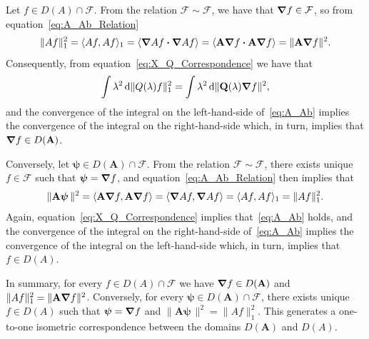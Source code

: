 \documentclass[leqno,onefignum,onetabnum]{siamltex1213}
\renewcommand{\d}{\mathrm{d}}
\newcommand{\Ab}{\mathbf{A}}
\newcommand{\Qb}{\mathbf{Q}}
\newcommand{\Fc}{\mathcal{F}}
\newcommand{\Fs}{\mathscr{F}}
\newcommand\bnabla{\mbox{\boldmath${\nabla}$}}
\providecommand\bcdot{\boldsymbol{\cdot}}
\newcommand{\vecpsi}{\boldsymbol{\psi}}
\begin{document}
Let $f\in D(A)\cap\Fs$. From the relation
$\Fs\sim\Fc$, we have that $\bnabla f\in\Fc$, so from
equation~\eqref{eq:A_Ab_Relation}    
%
\begin{align}\label{eq:Norm_A_Ab}
  \|Af\|_1^2=\langle Af,Af\rangle_1
        =\langle\bnabla  A f\bcdot\bnabla  A f\rangle
        =\langle\Ab\bnabla f\bcdot\Ab\bnabla f\rangle
        =\|\Ab\bnabla f\|^2.
\end{align}
%
Consequently, from equation~\eqref{eq:X_Q_Correspondence} we have that
%
\begin{align}\label{eq:A_Ab}
  \int\lambda^2\,\d\|Q(\lambda)f\|_1^2=\int\lambda^2\,\d\|\Qb(\lambda)\bnabla f\|^2,
\end{align}
%
and the convergence of the integral on the left-hand-side
of~\eqref{eq:A_Ab} implies the convergence of the integral on the
right-hand-side which, in turn, implies that $\bnabla f\in D(\Ab)$.


Conversely, let $\vecpsi\in D(\Ab)\cap\Fc$. From the
relation $\Fs\sim\Fc$, there exists unique $f\in\Fs$ such that
$\vecpsi=\bnabla f$, and equation~\eqref{eq:A_Ab_Relation} then
implies that     
%
\begin{align}
  \|\Ab\vecpsi\,\|^2=\langle\Ab\bnabla f,\Ab\bnabla f\rangle
         =\langle\bnabla  A f,\bnabla  A f\rangle
         =\langle Af,Af\rangle_1
         =\|Af\|_1^2.
\end{align}
%
Again, equation~\eqref{eq:X_Q_Correspondence} implies
that~\eqref{eq:A_Ab} holds, and the convergence of the integral on the
right-hand-side of~\eqref{eq:A_Ab} implies the 
convergence of the integral on the left-hand-side which, in turn, implies that
$f\in D(A)$.


In summary, for every $f\in D(A)\cap\Fs$ we have
$\bnabla f\in D(\Ab)$ and $\|Af\|_1^2=\|\Ab\bnabla f\|^2$. Conversely,
for every $\vecpsi\in D(\Ab)\cap\Fc$, there exists
unique $f\in D(A)$ such that $\vecpsi=\bnabla f$ and
$\|\Ab\vecpsi\,\|^2=\|Af\|_1^2$. This generates a one-to-one isometric
correspondence between the domains $D(\Ab)$ and $D(A)$.      
\end{document}
